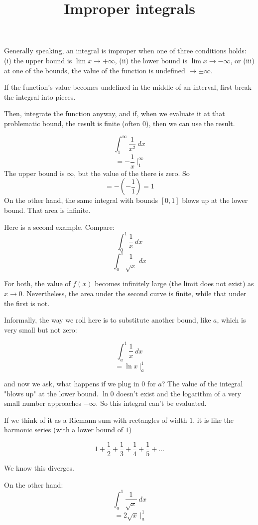 \documentclass[11pt, oneside]{article}
\title{Improper integrals}
\date{}
\begin{document}
\maketitle
\Large

\label{sec:Improper_integrals}

Generally speaking, an integral is improper when one of three conditions holds:  (i) the upper bound is $\lim x \rightarrow + \infty$, (ii) the lower bound is $\lim x \rightarrow - \infty$, or (iii) at one of the bounds, the value of the function is undefined $\rightarrow \pm \infty$.  

If the function's value becomes undefined in the middle of an interval, first break the integral into pieces.

Then, integrate the function anyway, and if, when we evaluate it at that problematic bound, the result is finite (often $0$), then we can use the result.

\[ \int_1^{\infty} \frac{1}{x^2} \ dx \]
\[ = - \frac{1}{x} \ \bigg |_1^{\infty}  \]
The upper bound is $\infty$, but the value of the there is zero.  So
\[ = - (- \frac{1}{1}) = 1  \]
On the other hand, the same integral with bounds $[0,1]$ blows up at the lower bound.  That area is infinite.

Here is a second example.  Compare:
\[ \int_0^1 \frac{1}{x} \ dx \]
\[ \int_0^1 \frac{1}{\sqrt{x}} \ dx \]

For both, the value of $f(x)$ becomes infinitely large (the limit does not exist) as $x \rightarrow 0$.  Nevertheless, the area under the second curve is finite, while that under the first is not.

Informally, the way we roll here is to substitute another bound, like $a$, which is very small but not zero:

\[ \int_a^1 \frac{1}{x} \ dx \]
\[ = \ln x \ \bigg |_a^1 \]
    
and now we ask, what happens if we plug in $0$ for $a$?  The value of the integral "blows up" at the lower bound.  $\ln 0$ doesn't exist and the logarithm of a very small number approaches $- \infty$.  So this integral can't be evaluated.

If we think of it as a Riemann sum with rectangles of width $1$, it is like the harmonic series (with a lower bound of $1$)

\[ 1 + \frac{1}{2} + \frac{1}{3} + \frac{1}{4} + \frac{1}{5} + \dots \]

We know this diverges.

On the other hand:
\[  \int_a^1 \frac{1}{\sqrt{x}} \ dx \]
\[ = 2 \sqrt{x} \ \bigg |_a^1 \]
\end{document}
